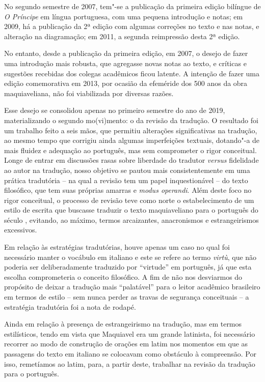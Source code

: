 No segundo semestre de 2007, tem"-se a publicação da primeira edição
bilíngue de \emph{O Príncipe} em língua portuguesa, com uma pequena
introdução e notas; em 2009, há a publicação da 2ª edição com algumas
correções no texto e nas notas, e alteração na diagramação; em 2011, a
segunda reimpressão desta 2ª edição.

No entanto, desde a publicação da primeira edição, em 2007, o desejo de
fazer uma introdução mais robusta, que agregasse novas notas ao texto, e
críticas e sugestões recebidas dos colegas acadêmicos ficou latente. A
intenção de fazer uma edição comemorativa em 2013, por ocasião da
efeméride dos 500 anos da obra maquiaveliana, não foi viabilizada por
diversas razões.

Esse desejo se consolidou apenas no primeiro semestre do ano de 2019,
materializando o segundo mo(vi)mento: o da revisão da tradução. O
resultado foi um trabalho feito a seis mãos, que permitiu alterações
significativas na tradução, ao mesmo tempo que corrigiu ainda algumas
imperfeições textuais, dotando"-a de mais fluidez e adequação ao
português, mas sem comprometer o rigor conceitual. Longe de entrar em
discussões rasas sobre liberdade do tradutor \emph{versus} fidelidade ao
autor na tradução, nosso objetivo se pautou mais consistentemente em uma
prática tradutória -- na qual a revisão tem um papel inquestionável --
do texto filosófico, que tem suas próprias amarras e \emph{modus
operandi}. Além deste foco no rigor conceitual, o processo de revisão
teve como norte o estabelecimento de um estilo de escrita que buscasse
traduzir o texto maquiaveliano para o português do século , evitando,
ao máximo, termos arcaizantes, anacronismos e estrangeirismos
excessivos.

Em relação às estratégias tradutórias, houve apenas um caso no qual foi
necessário manter o vocábulo em italiano e este se refere ao termo
\emph{virtù}, que não poderia ser deliberadamente traduzido por
``virtude'' em português, já que esta escolha comprometeria o conceito
filosófico. A fim de não nos desviarmos do propósito de deixar a
tradução mais ``palatável'' para o leitor acadêmico brasileiro em termos
de estilo -- sem nunca perder as travas de segurança conceituais -- a
estratégia tradutória foi a nota de rodapé.

Ainda em relação à presença de estrangeirismo na tradução, mas em termos
estilísticos, tendo em vista que Maquiavel era um grande latinista, foi
necessário recorrer ao modo de construção de orações em latim nos
momentos em que as passagens do texto em italiano se colocavam como
obstáculo à compreensão. Por isso, remetíamos ao latim, para, a partir
deste, trabalhar na revisão da tradução para o português.

